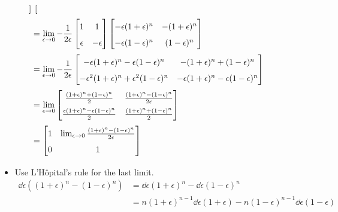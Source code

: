 \documentclass{article}
\begin{document}
\begin{itemize}
\begin{align*}
\begin{bmatrix}
        \end{bmatrix}\\
        &= \lim_{\epsilon\to 0} -\frac{1}{2\epsilon}
        \begin{bmatrix}
            1 & 1\\
            \epsilon & -\epsilon\\
        \end{bmatrix}
        \begin{bmatrix}
            -\epsilon(1+\epsilon)^n & -(1+\epsilon)^n\\
            -\epsilon(1-\epsilon)^n & (1-\epsilon)^n\\
        \end{bmatrix}\\
        &= \lim_{\epsilon\to 0} -\frac{1}{2\epsilon}
        \begin{bmatrix}
            -\epsilon(1+\epsilon)^n-\epsilon(1-\epsilon)^n & -(1+\epsilon)^n+(1-\epsilon)^n\\
            -\epsilon^2(1+\epsilon)^n+\epsilon^2(1-\epsilon)^n & -\epsilon(1+\epsilon)^n-\epsilon(1-\epsilon)^n\\
        \end{bmatrix}\\
        &= \lim_{\epsilon\to 0}
        \renewcommand{\arraystretch}{1.6}
        \begin{bmatrix}
            \frac{(1+\epsilon)^n+(1-\epsilon)^n}{2} & \frac{(1+\epsilon)^n-(1-\epsilon)^n}{2\epsilon}\\
            \frac{\epsilon(1+\epsilon)^n-\epsilon(1-\epsilon)^n}{2} & \frac{(1+\epsilon)^n+(1-\epsilon)^n}{2}\\
        \end{bmatrix}\\
        &=
        \begin{bmatrix}
            1 & \lim_{\epsilon\to 0} \frac{(1+\epsilon)^n-(1-\epsilon)^n}{2\epsilon}\\
            0 & 1\\
        \end{bmatrix}
    \end{align*}
    \begin{itemize}
        \item Use L'H\^{o}pital's rule for the last limit.
        \begin{align*}
            \dd{\epsilon}\left( (1+\epsilon)^n-(1-\epsilon)^n \right) &= \dd{\epsilon}(1+\epsilon)^n-\dd{\epsilon}(1-\epsilon)^n\\
            &= n(1+\epsilon)^{n-1}\dd{\epsilon}(1+\epsilon)-n(1-\epsilon)^{n-1}\dd{\epsilon}(1-\epsilon)\\

\end{align*}
\end{itemize}
\end{itemize}
\end{document}
